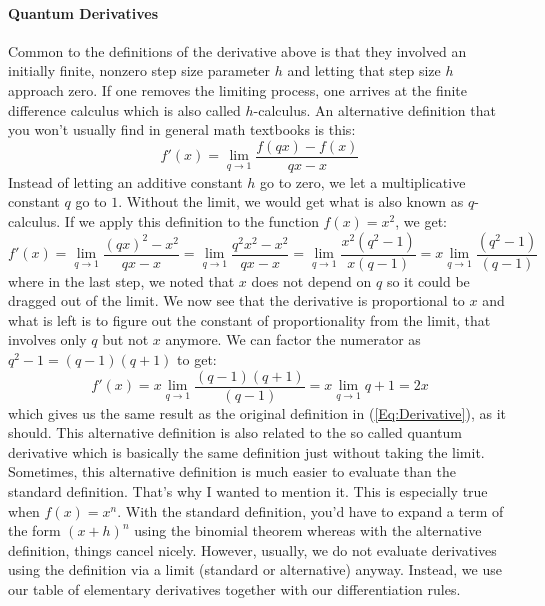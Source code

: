 
\paragraph{Quantum Derivatives}
Common to the definitions of the derivative above is that they involved an initially finite, nonzero step size parameter $h$ and letting that step size $h$ approach zero. If one removes the limiting process, one arrives at the finite difference calculus which is also called $h$-calculus. An alternative definition that you won't usually find in general math textbooks is this:
\begin{equation}
 f'(x) = \lim_{q \rightarrow 1} \frac{f(q x) - f(x)}{ q x - x }
\end{equation}
Instead of letting an additive constant $h$ go to zero, we let a multiplicative constant $q$ go to $1$. Without the limit, we would get what is also known as $q$-calculus. If we apply this definition to the function $f(x) = x^2$, we get:
\begin{equation}
f'(x) = \lim_{q \rightarrow 1} \frac{(q x)^2 - x^2}{ q x - x }
      = \lim_{q \rightarrow 1} \frac{q^2 x^2 - x^2}{ q x - x }
      = \lim_{q \rightarrow 1} \frac{x^2 (q^2 - 1)}{ x (q - 1)}
      = x \lim_{q \rightarrow 1} \frac{(q^2 - 1)}{(q - 1)}         
\end{equation}
where in the last step, we noted that $x$ does not depend on $q$ so it could be dragged out of the limit. We now see that the derivative is proportional to $x$ and what is left is to figure out the constant of proportionality from the limit, that involves only $q$ but not $x$ anymore. We can factor the numerator as $q^2 - 1 = (q-1)(q+1)$ to get:
\begin{equation}
f'(x) = x \lim_{q \rightarrow 1} \frac{(q-1)(q+1)}{(q - 1)}     
      = x \lim_{q \rightarrow 1} q+1
      = 2 x
\end{equation}
which gives us the same result as the original definition in (\ref{Eq:Derivative}), as it should. This alternative definition is also related to the so called quantum derivative which is basically the same definition just without taking the limit. Sometimes, this alternative definition is much easier to evaluate than the standard definition. That's why I wanted to mention it. This is especially true when $f(x) = x^n$. With the standard definition, you'd have to expand a term of the form $(x+h)^n$ using the binomial theorem whereas with the alternative definition, things cancel nicely. However, usually, we do not evaluate derivatives using the definition via a limit (standard or alternative) anyway. Instead, we use our table of elementary derivatives together with our differentiation rules.

